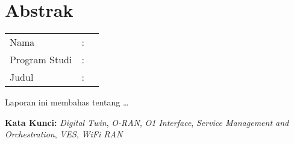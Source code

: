 %
%
%

\chapter*{Abstrak}

\vspace*{0.2cm}
{
	\setlength{\parindent}{0pt}
	
	\begin{tabular}{@{}l l p{10cm}}
		Nama&: & \penulis \\
		Program Studi&: & \program \\
		Judul&: & \judul \\
	\end{tabular}

	\bigskip
	\bigskip

    Laporan ini membahas tentang \ldots


    \vspace{1em}
    \noindent
    \textbf{Kata Kunci:} \textit{Digital Twin}, \textit{O-RAN}, \textit{O1 Interface}, \textit{Service Management and Orchestration}, \textit{VES}, \textit{WiFi RAN}
}

\newpage